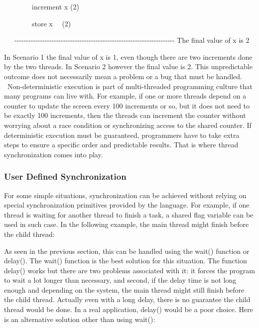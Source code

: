 \ \ \ \ \ \ \ \ increment x (2)

\ \ \ \ \ \ \ \ store x \ \ (2)

\ \ \ {}-{}-{}-{}-{}-{}-{}-{}-{}-{}-{}-{}-{}-{}-{}-{}-{}-{}-{}-{}-{}-{}-{}-{}-{}-{}-{}-{}-{}-{}-{}-{}-{}-{}-{}-{}-{}-{}-{}-{}-{}-{}-{}-{}-{}-{}-{}-{}-{}-{}-{}-{}-{}-{}-{}-{}-{}-{}-{}-{}-{}-{}-{}-{}-{}-{}-{}-{}-{}-
The final value of \textsf{x} is \textsf{2}


\bigskip

In Scenario 1 the final value of \textsf{x} is
\textsf{1}, even though there are two increments done by the
two threads. In Scenario 2 however the final value is
\textsf{2}. This unpredictable outcome does not necessarily
mean a problem or a bug that must be handled. \ Non-deterministic
execution is part of multi-threaded programming culture that many
programs can live with. For example, if one or more threads depend on a
counter to update the screen every 100 increments or so, but it does
not need to be exactly 100 increments, then the threads can increment
the counter without worrying about a race condition or synchronizing
access to the shared counter. If deterministic execution must be
guaranteed, programmers have to take extra steps to ensure a specific
order and predictable results. That is where thread synchronization
comes into play.

\subsubsection[User Defined Synchronization]{User Defined
Synchronization}

For some simple situations, synchronization can be achieved without
relying on special synchronization primitives provided by the language.
For example, if one thread is waiting for another thread to finish a
task, a shared flag variable can be used in such case. In the following
example, the main thread might finish before the child thread:


As seen in the previous section, this can be handled using the
\textsf{wait()} function or \textsf{delay()}. The
\textsf{wait()} function is the best solution for this
situation. The function \textsf{delay() }works but there are
two problems associated with it: it forces the program to wait a lot
longer than necessary, and second, if the delay time is not long enough
and depending on the system, the main thread might still finish before
the child thread. Actually even with a long delay, there is no
guarantee the child thread would be done. In a real application,
\textsf{delay()} would be a poor choice. Here is an
alternative solution other than using \textsf{wait()}:

